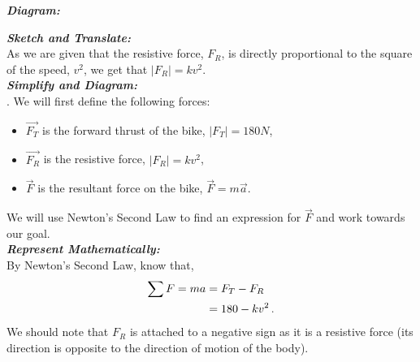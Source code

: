 %
%
%


\begin{subquestions}
	
\subquestion

\textbf{\textit{Diagram:}} \\


\subquestion

\textbf{\textit{Sketch and Translate:}} \\
As we are given that the resistive force, $F_R$, is directly proportional to the square of the speed, $v^2$, we get that $|F_R|=kv^2$. \\




\textbf{\textit{Simplify and Diagram:}} \\
. We will first define the following forces:
\begin{itemize}
	\item $\vec{F_T}$ is the forward thrust of the bike, $|F_T|=180N$,
	\item $\vec{F_R}$ is the resistive force, $|F_R|=kv^2$,
	\item $\vec{F}$ is the resultant force on the bike, $\vec{F}=m\vec{a}$.
\end{itemize}
We will use Newton's Second Law to find an expression for $\vec{F}$ and work towards our goal.\\




\textbf{\textit{Represent Mathematically:}} \\
By Newton's Second Law, know that,
\begin{align}
	\sum F = ma & = F_T - F_R \nonumber \\
           & = 180-kv^2 \,.	\label{2006:q6:FEqn1} 
\end{align}
We should note that $F_R$ is attached to a negative sign as it is a resistive force (its direction is opposite to the direction of motion of the body).


\end{subquestions}
